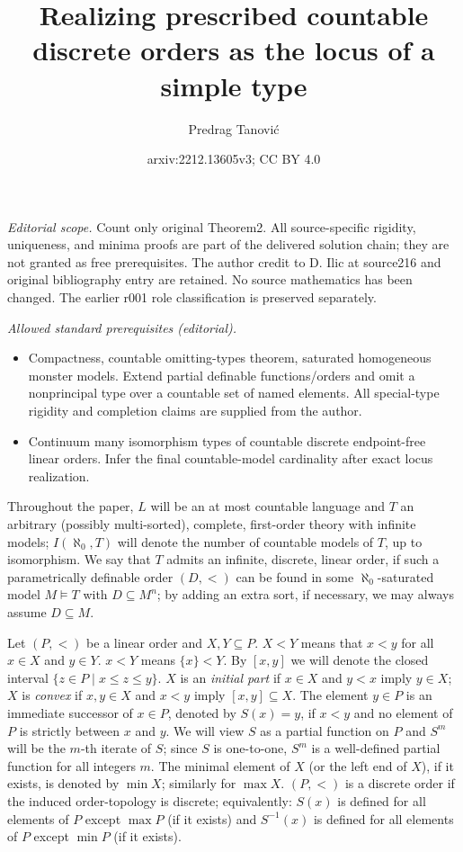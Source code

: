 \documentclass[10pt,a4paper]{amsart}
\title{Realizing prescribed countable discrete orders as the locus of a simple type}
\author{Predrag Tanović}
\date{arxiv:2212.13605v3; CC BY 4.0}
\theoremstyle{definition}
\begin{document}
\maketitle
\setcounter{Theorem1}{1}
\noindent\textit{Editorial scope.} Count only original Theorem2. All source-specific rigidity, uniqueness, and minima proofs are part of the delivered solution chain; they are not granted as free prerequisites. The author credit to D. Ilic at source216 and original bibliography entry are retained. No source mathematics has been changed. The earlier r001 role classification is preserved separately.\par\medskip
\noindent\textit{Allowed standard prerequisites (editorial).}\begin{itemize}
\item Compactness, countable omitting-types theorem, saturated homogeneous monster models. Extend partial definable functions/orders and omit a nonprincipal type over a countable set of named elements. All special-type rigidity and completion claims are supplied from the author.
\item Continuum many isomorphism types of countable discrete endpoint-free linear orders. Infer the final countable-model cardinality after exact locus realization.
\end{itemize}\medskip
Throughout the paper, $L$ will be an at most countable  language and $T$  an arbitrary (possibly multi-sorted), complete,  first-order theory with infinite models;  $I(\aleph_0,T)$ will denote the number of countable models of $T$, up to 
isomorphism.  We say that $T$  admits an infinite,  discrete, linear order, if such a parametrically definable order $(D,<)$ can be found in some   $\aleph_0$-saturated model $M\models T$ with $D\subseteq M^n$; by adding an extra sort, if necessary, we may always assume $D\subseteq M$. 

Let $(P,<)$ be a linear order and $X,Y\subseteq P$. $X<Y$ means that $x<y$ for all $x\in X$ and $y\in Y$.
$x<Y$ means  $\{x\}<Y$.  By $[x,y]$ we will denote the closed interval $\{z\in P\mid x\leq z\leq y\}$.  $X$ is an {\it initial part} if $x\in X$ and $y<x$ imply $y\in X$; $X$ is {\it convex} if $x,y\in X$ and $x<y$ imply $[x,y]\subseteq X$.
The element $y\in P$ is an immediate successor of $x\in P$, denoted by $S(x)=y$, if $x<y$ and no element of $P$ is strictly between $x$ and $y$. We will view $S$ as a partial function on $P$ and $S^m$ will be the $m$-th iterate of $S$; since $S$ is one-to-one, $S^m$ is a well-defined partial function for all  integers $m$. The minimal element of $X$ (or the left end of $X$), if it exists, is denoted by $\min X$; similarly for $\max X$. $(P,<)$ is a discrete order if the induced order-topology is discrete; equivalently: $S(x)$ is defined for all elements of $P$ except $\max P$ (if it exists) and  $S^{-1}(x)$ is defined for all elements of $P$ except $\min P$ (if it exists). 
\end{document}
